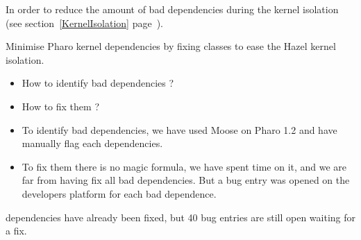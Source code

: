 In order to reduce the amount of bad dependencies during the kernel isolation (see section~\ref{KernelIsolation} page~\pageref{KernelIsolation}).

\goal Minimise Pharo kernel dependencies by fixing classes to ease the Hazel kernel isolation.

\problems 
\begin{itemize}
	\item How to identify bad dependencies ?
	\item How to fix them ?
\end{itemize}

\solutions
\begin{itemize}
	\item To identify bad dependencies, we have used \gls{Moose} on \gls{Pharo} 1.2 and have manually flag each dependencies.
	\item To fix them there is no magic formula, we have spent time on it, and we are far from having fix all bad dependencies. But a bug entry was opened on the developers platform for each bad dependence.
\end{itemize}

 dependencies have already been fixed, but 40 bug entries are still open waiting for a fix.